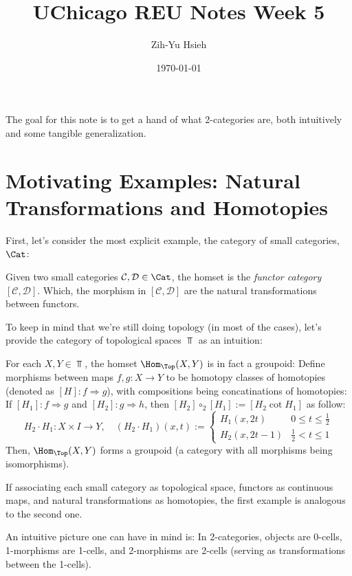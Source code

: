 \documentclass{article}
\title{UChicago REU Notes Week 5}
\author{Zih-Yu Hsieh}
\date{\today}
\begin{document}
\maketitle
\tableofcontents

The goal for this note is to get a hand of what 2-categories are, both intuitively and some tangible generalization.

\hfil

\section{Motivating Examples: Natural Transformations and Homotopies}

First, let's consider the most explicit example, the category of small categories, $\Cat$:
\begin{exmp}
    Given two small categories $\mathcal{C},\mathcal{D}\in\Cat$, the homset is the \emph{functor category} $[\mathcal{C},\mathcal{D}]$. Which, the morphism in $[\mathcal{C},\mathcal{D}]$ are the natural transformations between functors. 
\end{exmp}

To keep in mind that we're still doing topology (in most of the cases), let's provide the category of topological spaces $\Top$ as an intuition:

\begin{exmp}
    For each $X,Y\in\Top$, the homset $\Hom_\Top (X,Y)$ is in fact a groupoid: Define morphisms between maps $f,g:X\rightarrow Y$ to be homotopy classes of homotopies (denoted as $[H]:f\Rightarrow g$), with compositions being concatinations of homotopies: If $[H_1]:f\Rightarrow g$ and $[H_2]:g\Rightarrow h$, then $[H_2]\circ_2 [H_1]:=[H_2\cot H_1]$ as follow:
    \[H_2\cdot H_1:X\times I\rightarrow Y,\quad (H_2\cdot H_1)(x,t):= \begin{cases}
        H_1(x,2t) & 0\leq t\leq \frac{1}{2}\\
        H_2(x,2t-1) & \frac{1}{2}<t\leq 1
    \end{cases}\]
    Then, $\Hom_\Top (X,Y)$ forms a groupoid (a category with all morphisms being isomorphisms).
\end{exmp}

\hfil

If associating each small category as topological space, functors as continuous maps, and natural transformations as homotopies, the first example is analogous to the second one. 

An intuitive picture one can have in mind is: In 2-categories, objects are 0-cells, 1-morphisms are 1-cells, and 2-morphisms are 2-cells (serving as transformations between the 1-cells).
\end{document}
